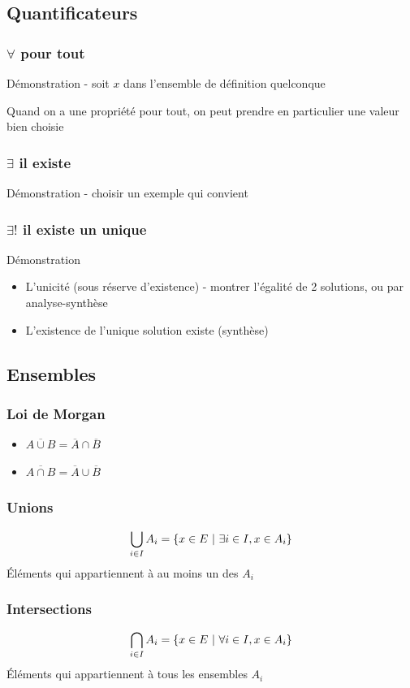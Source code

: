 \documentclass[openany]{book}
\begin{document}
\subsection{Quantificateurs}
\subsubsection{$ \forall $ pour tout}
Démonstration - soit $ x $ dans l'ensemble de définition quelconque

Quand on a une propriété pour tout, on peut prendre en particulier une valeur bien choisie

\subsubsection{$ \exists $ il existe}
Démonstration - choisir un exemple qui convient

\subsubsection{$ \exists! $ il existe un unique}
Démonstration
\begin{itemize}
    \item L'unicité (sous réserve d'existence) - montrer l'égalité de 2 solutions, ou par analyse-synthèse
    \item L'existence de l'unique solution existe (synthèse)
\end{itemize}

\subsection{Ensembles}
\subsubsection{Loi de Morgan}
\begin{itemize}
    \item $ \overline{A \cup B} = \overline{A}\cap\overline{B} $
    \item $ \overline{A \cap B} = \overline{A}\cup\overline{B} $
\end{itemize}

\subsubsection{Unions}
\[ \bigcup_{i \in I} A_i = \left\{x \in E \text{ } | \text{ } \exists i \in I, x \in A_i\right\} \]
Éléments qui appartiennent à au moins un des $ A_i $
\subsubsection{Intersections}
\[ \bigcap_{i \in I} A_i = \left\{x \in E \text{ } | \text{ } \forall i \in I, x \in A_i\right\} \]
Éléments qui appartiennent à tous les ensembles $ A_i $
\end{document}
